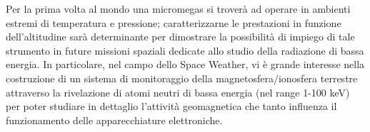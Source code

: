 \begin{enumerate}
Per la prima volta al mondo una micromegas si troverà ad operare in ambienti estremi di temperatura e pressione; caratterizzarne le prestazioni in funzione dell'altitudine sarà determinante per dimostrare la possibilità di impiego di tale strumento in future missioni spaziali dedicate allo studio della radiazione di bassa energia. In particolare, nel campo dello Space Weather, vi è grande interesse nella costruzione di un sistema di monitoraggio della magnetosfera/ionosfera terrestre attraverso la rivelazione di atomi neutri di bassa energia (nel range 1-100 keV) per poter studiare in dettaglio l’attività geomagnetica che tanto influenza il funzionamento delle apparecchiature elettroniche.
\end{enumerate}
